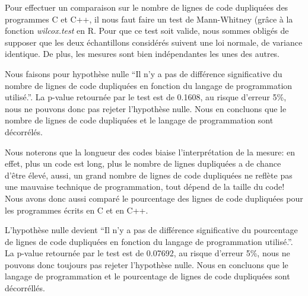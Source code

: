 Pour effectuer un comparaison sur le nombre de lignes de code
dupliquées des programmes C et C++, il nous faut faire un test de
Mann-Whitney (grâce à la fonction \emph{wilcox.test} en R. Pour que ce
test soit valide, nous sommes obligés de supposer que les deux
échantillons considérés suivent une loi normale, de variance
identique. De plus, les mesures sont bien indépendantes les unes des
autres.

Nous faisons pour hypothèse nulle ``Il n'y a pas de différence
significative du nombre de lignes de code dupliquées en fonction du
langage de programmation utilisé.''. La p-value retournée par le test
est de 0.1608, au risque d'erreur 5\%, nous ne pouvons donc pas rejeter
l'hypothèse nulle. Nous en concluons que le nombre de lignes de code
dupliquées et le langage de programmation sont décorrélés.

Nous noterons que la longueur des codes biaise l'interprétation de la
mesure: en effet, plus un code est long, plus le nombre de lignes
dupliquées a de chance d'être élevé, aussi, un grand nombre de lignes
de code dupliquées ne reflète pas une mauvaise technique de
programmation, tout dépend de la taille du code!  Nous avons donc
aussi comparé le pourcentage des lignes de code dupliquées pour les
programmes écrits en C et en C++.

L'hypothèse nulle devient ``Il n'y a pas de différence significative
du pourcentage de lignes de code dupliquées en fonction du langage de
programmation utilisé.''.  La p-value retournée par le test est de
0.07692, au risque d'erreur 5\%, nous ne pouvons donc toujours pas
rejeter l'hypothèse nulle. Nous en concluons que le langage de
programmation et le pourcentage de lignes de code dupliquées sont
décorréllés.

